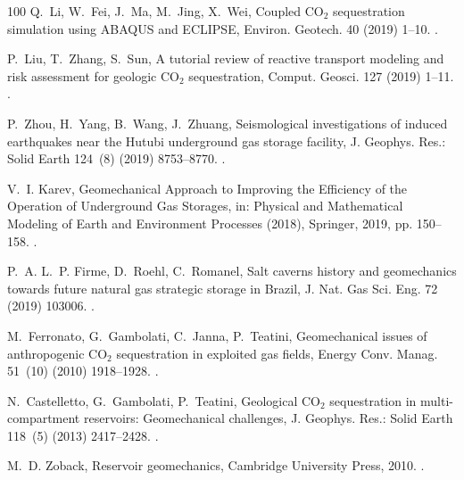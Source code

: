 \documentclass[3p,times]{elsarticle}
\theoremstyle{plain}
\begin{document}
\begin{thebibliography}{100}
Q.~Li, W.~Fei, J.~Ma, M.~Jing, X.~Wei, {Coupled CO$_2$ sequestration simulation
  using ABAQUS and ECLIPSE}, Environ. Geotech. 40 (2019) 1--10.
\newblock \href {https://doi.org/10.1680/jenge.18.00036}
  {}.

P.~Liu, T.~Zhang, S.~Sun, {A tutorial review of reactive transport modeling and
  risk assessment for geologic CO$_2$ sequestration}, Comput. Geosci. 127
  (2019) 1--11.
\newblock \href {https://doi.org/10.1016/j.cageo.2019.02.007}
  {}.

P.~Zhou, H.~Yang, B.~Wang, J.~Zhuang, {Seismological investigations of induced
  earthquakes near the Hutubi underground gas storage facility}, J. Geophys.
  Res.: Solid Earth 124~(8) (2019) 8753--8770.
\newblock \href {https://doi.org/10.1029/2019JB017360}
  {}.

V.~I. Karev, {Geomechanical Approach to Improving the Efficiency of the
  Operation of Underground Gas Storages}, in: Physical and Mathematical
  Modeling of Earth and Environment Processes (2018), Springer, 2019, pp.
  150--158.
\newblock \href {https://doi.org/10.1007/978-3-030-11533-3_16}
  {}.

P.~A. L.~P. Firme, D.~Roehl, C.~Romanel, {Salt caverns history and geomechanics
  towards future natural gas strategic storage in Brazil}, J. Nat. Gas Sci.
  Eng. 72 (2019) 103006.
\newblock \href {https://doi.org/10.1016/j.jngse.2019.103006}
  {}.

M.~Ferronato, G.~Gambolati, C.~Janna, P.~Teatini, {Geomechanical issues of
  anthropogenic CO$_2$ sequestration in exploited gas fields}, Energy Conv.
  Manag. 51~(10) (2010) 1918--1928.
\newblock \href {https://doi.org/10.1016/j.enconman.2010.02.024}
  {}.

N.~Castelletto, G.~Gambolati, P.~Teatini, {Geological CO$_2$ sequestration in
  multi-compartment reservoirs: Geomechanical challenges}, J. Geophys. Res.:
  Solid Earth 118~(5) (2013) 2417--2428.
\newblock \href {https://doi.org/10.1002/jgrb.50180}
  {}.

M.~D. Zoback, {Reservoir geomechanics}, Cambridge University Press, 2010.
\newblock \href {https://doi.org/10.1017/cbo9780511586477}
  {}.


\end{thebibliography}
\end{document}
